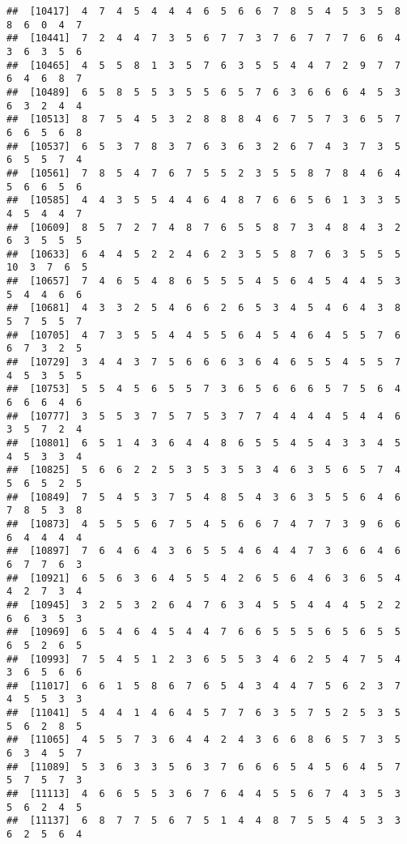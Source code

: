 \documentclass[
]{book}
\begin{document}
\begin{verbatim}
##  [10417]  4  7  4  5  4  4  4  6  5  6  6  7  8  5  4  5  3  5  8  8  6  0  4  7
##  [10441]  7  2  4  4  7  3  5  6  7  7  3  7  6  7  7  7  6  6  4  3  6  3  5  6
##  [10465]  4  5  5  8  1  3  5  7  6  3  5  5  4  4  7  2  9  7  7  6  4  6  8  7
##  [10489]  6  5  8  5  5  3  5  5  6  5  7  6  3  6  6  6  4  5  3  6  3  2  4  4
##  [10513]  8  7  5  4  5  3  2  8  8  8  4  6  7  5  7  3  6  5  7  6  6  5  6  8
##  [10537]  6  5  3  7  8  3  7  6  3  6  3  2  6  7  4  3  7  3  5  6  5  5  7  4
##  [10561]  7  8  5  4  7  6  7  5  5  2  3  5  5  8  7  8  4  6  4  5  6  6  5  6
##  [10585]  4  4  3  5  5  4  4  6  4  8  7  6  6  5  6  1  3  3  5  4  5  4  4  7
##  [10609]  8  5  7  2  7  4  8  7  6  5  5  8  7  3  4  8  4  3  2  6  3  5  5  5
##  [10633]  6  4  4  5  2  2  4  6  2  3  5  5  8  7  6  3  5  5  5 10  3  7  6  5
##  [10657]  7  4  6  5  4  8  6  5  5  5  4  5  6  4  5  4  4  5  3  5  4  4  6  6
##  [10681]  4  3  3  2  5  4  6  6  2  6  5  3  4  5  4  6  4  3  8  5  7  5  5  7
##  [10705]  4  7  3  5  5  4  4  5  5  6  4  5  4  6  4  5  5  7  6  6  7  3  2  5
##  [10729]  3  4  4  3  7  5  6  6  6  3  6  4  6  5  5  4  5  5  7  4  5  3  5  5
##  [10753]  5  5  4  5  6  5  5  7  3  6  5  6  6  6  5  7  5  6  4  6  6  6  4  6
##  [10777]  3  5  5  3  7  5  7  5  3  7  7  4  4  4  4  5  4  4  6  3  5  7  2  4
##  [10801]  6  5  1  4  3  6  4  4  8  6  5  5  4  5  4  3  3  4  5  4  5  3  3  4
##  [10825]  5  6  6  2  2  5  3  5  3  5  3  4  6  3  5  6  5  7  4  5  6  5  2  5
##  [10849]  7  5  4  5  3  7  5  4  8  5  4  3  6  3  5  5  6  4  6  7  8  5  3  8
##  [10873]  4  5  5  5  6  7  5  4  5  6  6  7  4  7  7  3  9  6  6  6  4  4  4  4
##  [10897]  7  6  4  6  4  3  6  5  5  4  6  4  4  7  3  6  6  4  6  6  7  7  6  3
##  [10921]  6  5  6  3  6  4  5  5  4  2  6  5  6  4  6  3  6  5  4  4  2  7  3  4
##  [10945]  3  2  5  3  2  6  4  7  6  3  4  5  5  4  4  4  5  2  2  6  6  3  5  3
##  [10969]  6  5  4  6  4  5  4  4  7  6  6  5  5  5  6  5  6  5  5  6  5  2  6  5
##  [10993]  7  5  4  5  1  2  3  6  5  5  3  4  6  2  5  4  7  5  4  3  6  5  6  6
##  [11017]  6  6  1  5  8  6  7  6  5  4  3  4  4  7  5  6  2  3  7  4  5  5  3  3
##  [11041]  5  4  4  1  4  6  4  5  7  7  6  3  5  7  5  2  5  3  5  5  6  2  8  5
##  [11065]  4  5  5  7  3  6  4  4  2  4  3  6  6  8  6  5  7  3  5  6  3  4  5  7
##  [11089]  5  3  6  3  3  5  6  3  7  6  6  6  5  4  5  6  4  5  7  5  7  5  7  3
##  [11113]  4  6  6  5  5  3  6  7  6  4  4  5  5  6  7  4  3  5  3  5  6  2  4  5
##  [11137]  6  8  7  7  5  6  7  5  1  4  4  8  7  5  5  4  5  3  3  6  2  5  6  4

\end{verbatim}
\end{document}
